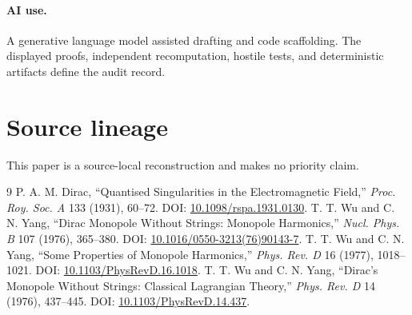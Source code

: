 \documentclass[10pt]{article}
\begin{document}
\paragraph{AI use.}
A generative language model assisted drafting and code scaffolding.  The
displayed proofs, independent recomputation, hostile tests, and deterministic
artifacts define the audit record.
\fi

\section*{Source lineage}
This paper is a source-local reconstruction and makes no priority claim.
\begin{thebibliography}{9}
P. A. M. Dirac, ``Quantised Singularities in the Electromagnetic Field,''
\emph{Proc. Roy. Soc. A} 133 (1931), 60--72. DOI:
\href{https://doi.org/10.1098/rspa.1931.0130}{10.1098/rspa.1931.0130}.
T. T. Wu and C. N. Yang, ``Dirac Monopole Without Strings: Monopole
Harmonics,'' \emph{Nucl. Phys. B} 107 (1976), 365--380. DOI:
\href{https://doi.org/10.1016/0550-3213(76)90143-7}%
{10.1016/0550-3213(76)90143-7}.
T. T. Wu and C. N. Yang, ``Some Properties of Monopole Harmonics,''
\emph{Phys. Rev. D} 16 (1977), 1018--1021. DOI:
\href{https://doi.org/10.1103/PhysRevD.16.1018}%
{10.1103/PhysRevD.16.1018}.
T. T. Wu and C. N. Yang, ``Dirac's Monopole Without Strings: Classical
Lagrangian Theory,'' \emph{Phys. Rev. D} 14 (1976), 437--445. DOI:
\href{https://doi.org/10.1103/PhysRevD.14.437}%
{10.1103/PhysRevD.14.437}.
\end{thebibliography}
\end{document}
